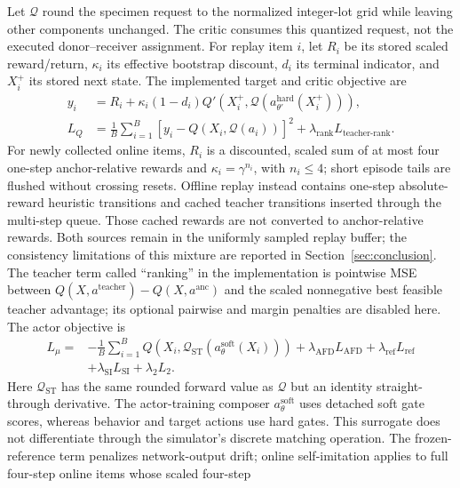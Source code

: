 \documentclass[preprint,review,12pt]{elsarticle}
\begin{document}
Let $\mathcal{Q}$ round the specimen request to the normalized integer-lot
grid while leaving other components unchanged. The critic consumes this
quantized request, not the executed donor--receiver assignment. For replay
item $i$, let $R_i$ be its stored scaled reward/return, $\kappa_i$ its effective
bootstrap discount, $d_i$ its terminal indicator, and $X_i^+$ its stored next
state. The implemented target and critic objective are
\begin{align}
y_i &= R_i+\kappa_i(1-d_i)
 Q'\!\left(X_i^+,\mathcal{Q}(a^{\mathrm{hard}}_{\theta'}(X_i^+))\right),
 \label{eq:routing-critic-target}\\
L_Q &= \frac{1}{B}\sum_{i=1}^{B}
 \left[y_i-Q(X_i,\mathcal{Q}(a_i))\right]^2
 +\lambda_{\mathrm{rank}}L_{\mathrm{teacher\mbox{-}rank}}.
\end{align}
For newly collected online items, $R_i$ is a discounted, scaled sum of at most
four one-step anchor-relative rewards and $\kappa_i=\gamma^{n_i}$, with
$n_i\leq4$; short episode tails are flushed without crossing resets. Offline
replay instead contains one-step absolute-reward heuristic transitions and
cached teacher transitions inserted through the multi-step queue. Those
cached rewards are not converted to anchor-relative rewards. Both sources
remain in the uniformly sampled replay buffer; the consistency limitations
of this mixture are reported in Section~\ref{sec:conclusion}.
The teacher term called ``ranking'' in the implementation is pointwise MSE
between $Q(X,a^{\mathrm{teacher}})-Q(X,a^{\mathrm{anc}})$ and the scaled
nonnegative best feasible teacher advantage; its optional pairwise and
margin penalties are disabled here. The actor objective is
\begin{align}
L_\mu={}&-\frac{1}{B}\sum_{i=1}^{B}
 Q\!\left(X_i,\mathcal{Q}_{\mathrm{ST}}(a^{\mathrm{soft}}_\theta(X_i))\right)
 +\lambda_{\mathrm{AFD}}L_{\mathrm{AFD}}
 +\lambda_{\mathrm{ref}}L_{\mathrm{ref}} \nonumber\\
&+\lambda_{\mathrm{SI}}L_{\mathrm{SI}}+\lambda_2L_2.
\label{eq:routing-actor-loss}
\end{align}
Here $\mathcal{Q}_{\mathrm{ST}}$ has the same rounded forward value as
$\mathcal{Q}$ but an identity straight-through derivative. The actor-training
composer $a^{\mathrm{soft}}_\theta$ uses detached soft gate scores, whereas
behavior and target actions use hard gates. This surrogate does not
differentiate through the simulator's discrete matching operation.
The frozen-reference term penalizes network-output drift; online
self-imitation applies to full four-step online items whose scaled four-step
\end{document}
